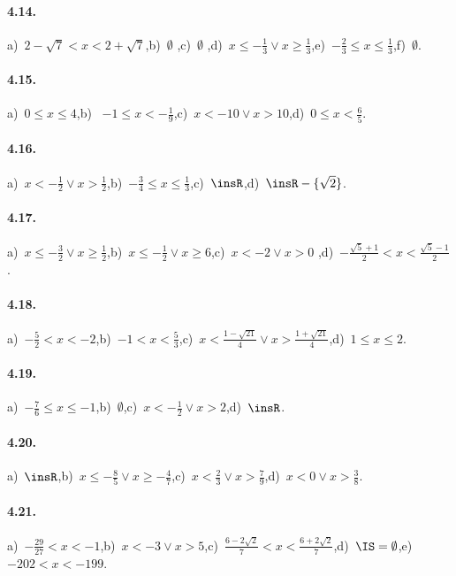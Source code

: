 \paragraph{4.14.} a)~$2-\sqrt 7<x<2+\sqrt 7$,\quad b)~$\emptyset $ ,\quad c)~$\emptyset $ ,\quad d)~$x\le -\frac 1 3\vee x\ge \frac 1 3$,\quad e)~$-\frac 2 3\le x\le \frac 1 3$,\quad f)~$\emptyset $.

\paragraph{4.15.} a)~$0\le x\le 4$,\quad b)~ $-1\le x<-\frac 1 9$,\quad c)~$x<-10\vee x>10$,\quad d)~$0\le x<\frac 6 5$.

\paragraph{4.16.} a)~$x<-\frac 1 2\vee x>\frac 1 2$,\quad b)~$-\frac 3 4\le x\le \frac 1 3$,\quad c)~$\insR$,\quad d)~$\insR-\{\sqrt 2\}$.

\paragraph{4.17.} a)~$x\le -\frac 3 2\vee x\ge \frac 1 2$,\quad b)~$x\le -\frac 1 2\vee x\ge 6$,\quad c)~$x<-2\vee x>0$ ,\quad d)~$-\frac{\sqrt 5+1} 2<x<\frac{\sqrt 5-1} 2$ .

\paragraph{4.18.} a)~$-\frac 5 2<x<-2$,\quad b)~$-1<x<\frac 5 3$,\quad c)~$x<\frac{1-\sqrt{21}} 4\vee x>\frac{1+\sqrt{21}} 4$,\quad d)~$1\le x\le 2$.

\paragraph{4.19.} a)~$-\frac 7 6\le x\le -1$,\quad b)~$\emptyset $,\quad c)~$x<-\frac 1 2\vee x>2$,\quad d)~$\insR$.

\paragraph{4.20.} a)~$\insR$,\quad b)~$x\le -\frac 8 5\vee x\ge -\frac 4 7$,\quad c)~$x<\frac 2 3\vee x>\frac 7 9$,\quad d)~$x<0\vee x>\frac 3 8$.

\paragraph{4.21.} a)~$-\frac{29}{27}<x<-1$,\quad b)~$x<-3\vee x>5$,\quad c)~$\frac{6-2\sqrt 2} 7<x<\frac{6+2\sqrt 2} 7$,\quad d)~$\IS=\emptyset $,\quad e)~$-202<x<-199$.

